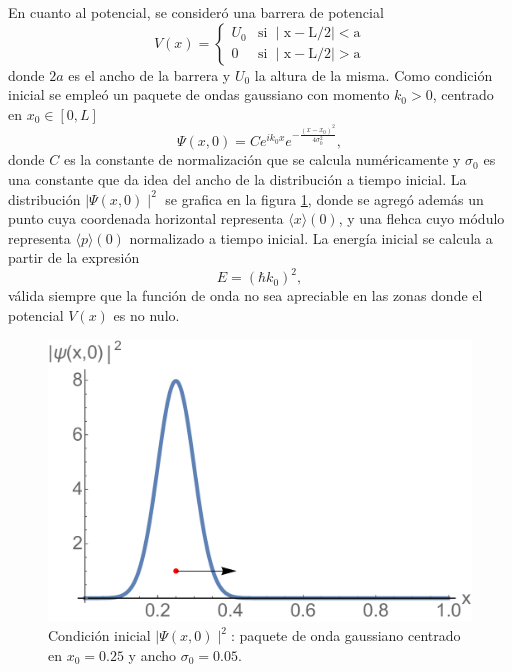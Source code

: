 \documentclass[aps,prb,twocolumn,superscriptaddress,floatfix,longbibliography]{revtex4-2}
\newif\ifptitle
\newif\ifpnumber
\newcounter{para}
\newcommand\ptitle[1]{\par\refstepcounter{para}
{\ifpnumber{\noindent\textcolor{lightgray}{\textbf{\thepara}}\indent}\fi}
{\ifptitle{\textbf{[{#1}]}}\fi}}
\begin{document}
En cuanto al potencial, se consideró una barrera de potencial
\[
V(x) = \left\{\begin{matrix}
U_0 & \mathrm{si \,\, \mid x - L/2 \mid < a} \\
0 &  \mathrm{si \,\, \mid x - L/2 \mid > a} 
\end{matrix}\right.
\]
donde $2 a$ es el ancho de la barrera y $U_0$ la altura de la misma. Como condición inicial se empleó un paquete de ondas gaussiano con momento $k_0 > 0$, centrado en $x_0 \in [0,L]$
\[ \Psi(x,0) = Ce^{i k_0 x} e^{-\frac{(x-x_0)^2}{4\sigma_0^2}}, \]
donde $C$ es la constante de normalización que se calcula numéricamente y $\sigma_0$ es una constante que da idea del ancho de la distribución a tiempo inicial. La distribución $\mid\Psi(x,0)\mid^2$ se grafica en la figura \ref{fig:condicion_inicial}, donde se agregó además un punto cuya coordenada horizontal representa $\langle x \rangle(0)$, y una flehca cuyo módulo representa $\langle p \rangle(0)$ normalizado a tiempo inicial. La energía inicial se calcula a partir de la expresión
\begin{equation}
E = (\hbar k_0)^2,
\label{eq:energia}
\end{equation}
válida siempre que la función de onda no sea apreciable en las zonas donde el potencial $V(x)$ es no nulo.

\begin{figure}[h]
    \includegraphics[clip=true,width=0.9\columnwidth]{condicion_inicial.pdf}
    \caption{Condición inicial $\mid \Psi(x,0) \mid^2$: paquete de onda gaussiano centrado en $x_0 = 0.25$ y ancho $\sigma_0 = 0.05$.}
     \label{fig:condicion_inicial}
\end{figure}

\ptitle{Qué casos se estudiaron}
\end{document}
